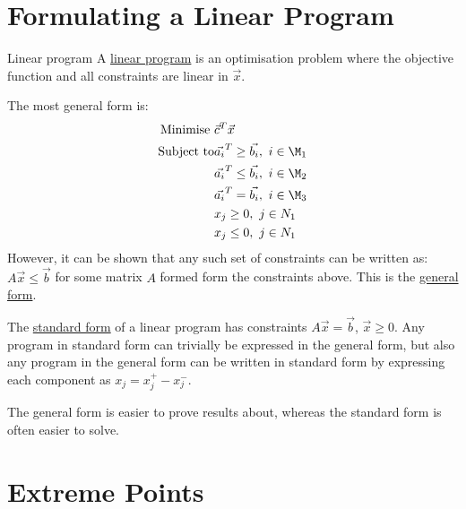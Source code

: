 \documentclass[../Main.tex]{subfiles}
\begin{document}
\section{Formulating a Linear Program}
\begin{definition}{Linear program}
    A \underline{linear program} is an optimisation problem where the objective function and all constraints are linear in $\vec{x}$.
\end{definition}
The most general form is:
\begin{align*}
    \text{Minimise } &\vec{c}^T\vec{x} \\
    \text{Subject to} &\vec{a_i}^T \geq \vec{b_i},~i \in \M_1 \\
    &\vec{a_i}^T \leq \vec{b_i},~i \in \M_2 \\
    &\vec{a_i}^T = \vec{b_i},~i \in \M_3 \\
    &x_j \geq 0,~j \in N_1 \\
    &x_j \leq 0,~j \in N_1 \\
\end{align*}
However, it can be shown that any such set of constraints can be written as: $A\vec{x} \leq \vec{b}$ for some matrix $A$ formed form the constraints above. This is the \underline{general form}.

The \underline{standard form} of a linear program has constraints $A\vec{x} = \vec{b}$, $\vec{x} \geq 0$. Any program in standard form can trivially be expressed in the general form, but also any program in the general form can be written in standard form by expressing each component as $x_j = x_j^+ - x_j^-$.

The general form is easier to prove results about, whereas the standard form is often easier to solve.
\section{Extreme Points}
\end{document}
